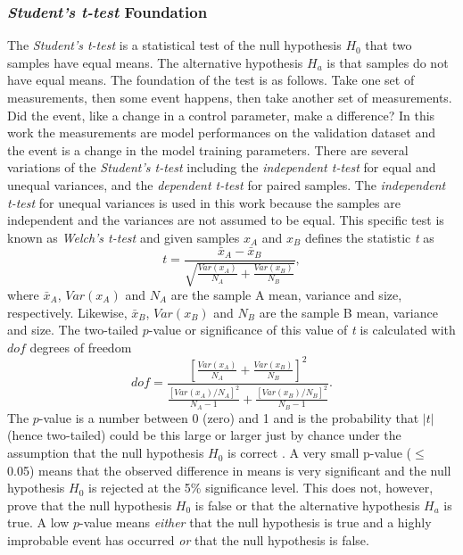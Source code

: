 \subsubsection{\textit{Student's t-test} Foundation}
\label{sec:students_t-test}
The \textit{Student's t-test} is a statistical test of the null hypothesis $H_{0}$ that two samples have equal means. The alternative hypothesis $H_{a}$ is that samples do not have equal means. The foundation of the test is as follows. Take one set of measurements, then some event happens, then take another set of measurements. Did the event, like a change in a control parameter, make a difference? In this work the measurements are model performances on the validation dataset and the event is a change in the model training parameters. There are several variations of the \textit{Student's t-test} including the \textit{independent t-test} for equal and unequal variances, and the \textit{dependent t-test} for paired samples. The \textit{independent t-test} for unequal variances is used in this work because the samples are independent and the variances are not assumed to be equal. This specific test is known as \textit{Welch's t-test} and given samples $x_{A}$ and $x_{B}$ defines the statistic \textit{t} as
\begin{equation} \label{eq:t_stat}
	t = \frac{\bar{x}_{A} - \bar{x}_{B}}{\sqrt{\frac{Var(x_{A})}{N_{A}} + \frac{Var(x_{B})}{N_{B}}}},
\end{equation}
where $\bar{x}_{A}$, $Var(x_{A})$ and $N_{A}$ are the sample A mean, variance and size, respectively. Likewise, $\bar{x}_{B}$, $Var(x_{B})$ and $N_{B}$ are the sample B mean, variance and size. The two-tailed $p$-value or significance of this value of \textit{t} is calculated with $dof$ degrees of freedom
\begin{equation} \label{eq:t_dof}
	dof = \frac{\left[\frac{Var(x_{A})}{N_{A}} + \frac{Var(x_{B})}{N_{B}}\right]^{2}}{\frac{\left[Var(x_{A})/N_{A}\right]^{2}}{N_{A} - 1} + \frac{\left[Var(x_{B})/N_{B}\right]^{2}}{N_{B} - 1}}.
\end{equation}
The $p$-value is a number between 0 (zero) and 1 and is the probability that $|t|$ (hence two-tailed) could be this large or larger just by chance under the assumption that the null hypothesis $H_{0}$ is correct \cite{10.5555/1403886}. A very small p-value ($\le$ 0.05) means that the observed difference in means is very significant and the null hypothesis $H_{0}$ is rejected at the 5\% significance level. This does not, however, prove that the null hypothesis $H_{0}$ is false or that the alternative hypothesis $H_{a}$ is true. A low $p$-value means \textit{either} that the null hypothesis is true and a highly improbable event has occurred \textit{or} that the null hypothesis is false.

